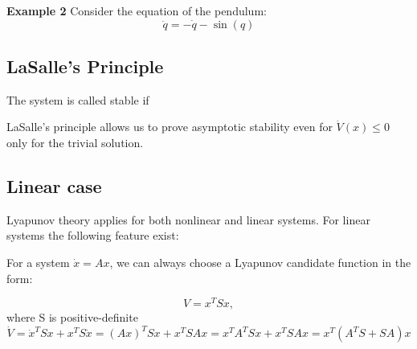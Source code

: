 \textbf{Example 2}
Consider the equation of the pendulum:
\[\ddot{q} = -\dot{q} - \sin(q)\]


\subsection{LaSalle's Principle}
The system is called stable if 


LaSalle's principle allows us to prove asymptotic stability even for $\dot{V}(x) \leq 0$ only for the trivial solution.


\subsection{Linear case}
Lyapunov theory applies for both nonlinear and linear systems. 
For linear systems the following feature exist:

For a system $\dot x = Ax$, we can always choose a Lyapunov candidate function in the form:

\[V = x^TSx, \] where S is positive-definite
\[\dot V = \dot x^T S x + x^T S \dot x = (Ax)^T Sx + x^TSAx = x^TA^TSx + x^TSAx = x^T (A^TS+SA) x\]


